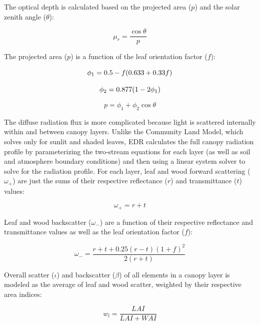 The optical depth is calculated based on the projected area ($p$) and the solar zenith angle ($\theta$):

\begin{equation}
  \mu_r = \frac{\cos{\theta}}{p}
\end{equation}

The projected area ($p$) is a function of the leaf orientation factor ($f$):

\begin{equation}\label{eq:phi1}
  \phi_1 = 0.5 - f (0.633 + 0.33 f) \\
\end{equation}

\begin{equation}\label{eq:phi2}
  \phi_2 = 0.877 (1 - 2 \phi_1) \\
\end{equation}

\begin{equation}
  p = \phi_1 + \phi_2 \cos{\theta} 
\end{equation}

The diffuse radiation flux is more complicated because light is scattered internally within and between canopy layers.
Unlike the Community Land Model, which solves only for sunlit and shaded leaves,
EDR calculates the full canopy radiation profile by parameterizing the two-stream equations for each layer (as well as soil and atmosphere boundary conditions)
and then using a linear system solver to solve for the radiation profile.
For each layer, leaf and wood forward scattering ($\omega_+$) are just the sums of their respective reflectance ($r$) and transmittance ($t$) values:

\begin{equation}
   \omega_+ = r + t 
\end{equation}

Leaf and wood backscatter ($\omega_-$) are a function of their respective reflectance and transmittance values as well as the leaf orientation factor ($f$):

\begin{equation}
   \omega_- = \frac{r + t + 0.25 (r - t) {(1 + f)} ^ 2}{2 (r + t)} 
\end{equation}

Overall scatter ($\iota$) and backscatter ($\beta$) of all elements in a canopy layer is modeled as the average of leaf and wood scatter, weighted by their respective area indices:

\begin{equation}\label{eq:wl}
  w_l = \frac{LAI}{LAI + WAI}
\end{equation}

